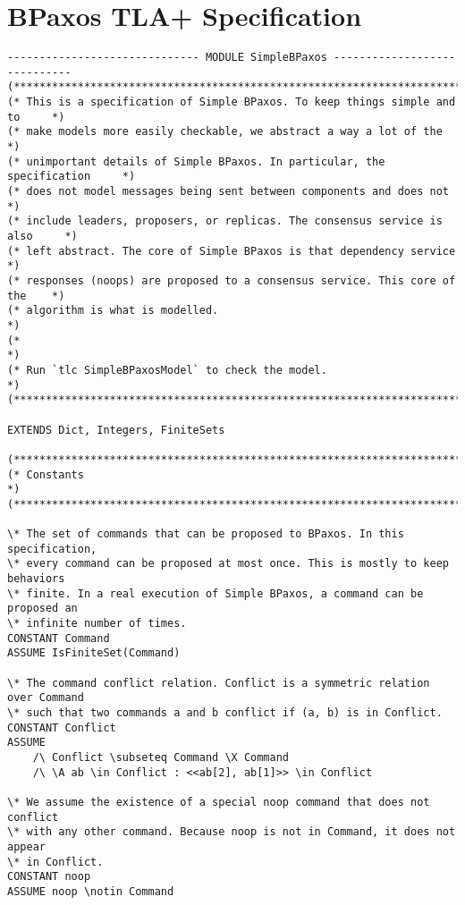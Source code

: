 \onecolumn
\section{BPaxos TLA+ Specification}
\begin{verbatim}
------------------------------ MODULE SimpleBPaxos -----------------------------
(******************************************************************************)
(* This is a specification of Simple BPaxos. To keep things simple and to     *)
(* make models more easily checkable, we abstract a way a lot of the          *)
(* unimportant details of Simple BPaxos. In particular, the specification     *)
(* does not model messages being sent between components and does not         *)
(* include leaders, proposers, or replicas. The consensus service is also     *)
(* left abstract. The core of Simple BPaxos is that dependency service        *)
(* responses (noops) are proposed to a consensus service. This core of the    *)
(* algorithm is what is modelled.                                             *)
(*                                                                            *)
(* Run `tlc SimpleBPaxosModel` to check the model.                            *)
(******************************************************************************)

EXTENDS Dict, Integers, FiniteSets

(******************************************************************************)
(* Constants                                                                  *)
(******************************************************************************)

\* The set of commands that can be proposed to BPaxos. In this specification,
\* every command can be proposed at most once. This is mostly to keep behaviors
\* finite. In a real execution of Simple BPaxos, a command can be proposed an
\* infinite number of times.
CONSTANT Command
ASSUME IsFiniteSet(Command)

\* The command conflict relation. Conflict is a symmetric relation over Command
\* such that two commands a and b conflict if (a, b) is in Conflict.
CONSTANT Conflict
ASSUME
    /\ Conflict \subseteq Command \X Command
    /\ \A ab \in Conflict : <<ab[2], ab[1]>> \in Conflict

\* We assume the existence of a special noop command that does not conflict
\* with any other command. Because noop is not in Command, it does not appear
\* in Conflict.
CONSTANT noop
ASSUME noop \notin Command


\end{verbatim}
